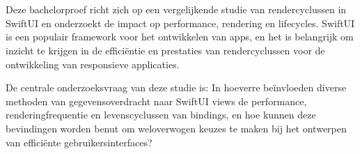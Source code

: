 
%
%
%
%
%

%



\chapter*{}
Deze bachelorproef richt zich op een vergelijkende studie van rendercyclussen in SwiftUI en onderzoekt de impact op performance, rendering en lifecycles. SwiftUI is een populair framework voor het ontwikkelen van apps, en het is belangrijk om inzicht te krijgen in de efficiëntie en prestaties van rendercyclussen voor de ontwikkeling van responsieve applicaties.

De centrale onderzoeksvraag van deze studie is: In hoeverre beïnvloeden diverse methoden van gegevensoverdracht naar SwiftUI views de performance, renderingfrequentie en levenscyclussen van bindings, en hoe kunnen deze bevindingen worden benut om weloverwogen keuzes te maken bij het ontwerpen van efficiënte gebruikersinterfaces?

